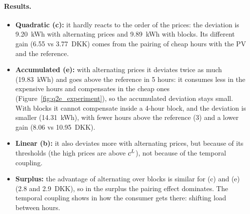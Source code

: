 \paragraph{Results.}
\begin{itemize}
    \item \textbf{Quadratic (c):} it hardly reacts to the order of the prices: the deviation is 9.20~kWh with alternating prices and 9.89~kWh with blocks. Its different gain (6.55 vs 3.77~DKK) comes from the pairing of cheap hours with the PV and the reference.
    \item \textbf{Accumulated (e):} with alternating prices it deviates twice as much (19.83~kWh) and goes above the reference in 5 hours: it consumes less in the expensive hours and compensates in the cheap ones (Figure~\ref{fig:q2e_experiment}), so the accumulated deviation stays small. With blocks it cannot compensate inside a 4-hour block, and the deviation is smaller (14.31~kWh), with fewer hours above the reference (3) and a lower gain (8.06 vs 10.95~DKK).
    \item \textbf{Linear (b):} it also deviates more with alternating prices, but because of its thresholds (the high prices are above $c^{L}$), not because of the temporal coupling.
    \item \textbf{Surplus:} the advantage of alternating over blocks is similar for (c) and (e) (2.8 and 2.9~DKK), so in the surplus the pairing effect dominates. The temporal coupling shows in how the consumer gets there: shifting load between hours.
\end{itemize}
